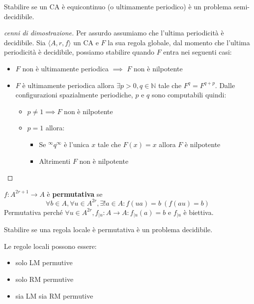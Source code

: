 \begin{teorema}
    Stabilire se un CA è equicontinuo (o ultimamente periodico) è un problema semi-decidibile.
    \begin{proof} [cenni di dimostrazione]
        Per assurdo assumiamo che l'ultima periodicità è decidibile. Sia 
        $\langle A,r,f\rangle$  un CA e $F$ la sua regola globale, dal momento
        che l'ultima periodicità è decidibile, possiamo stabilire quando $F$ entra 
        nei seguenti casi:
        \begin{itemize}
            \item $F$ non è ultimamente periodica $\implies$ $F$ non è nilpotente
            \item $F$ è ultimamente periodica allora $\exists p>0, q\in \mathbb{N}$
            tale che $F^q=F^{q+p}$. Dalle configurazioni spazialmente periodiche,
            $p$ e $q$ sono computabili quindi:
            \begin{itemize}
                \item $p\ne 1\implies F$ non è nilpotente
                \item $p= 1$ allora:
                \begin{itemize}
                    \item Se $^\infty q^\infty$ è l'unica $x$ tale che $F(x)=x$ allora
                    $F$ è nilpotente
                    \item Altrimenti $F$ non è nilpotente
                \end{itemize}
            \end{itemize}
        \end{itemize}
    \end{proof}
\end{teorema}

\begin{definizione}
    $f:A^{2r+1}\rightarrow A$ è \textbf{permutativa} se 
    $$\forall b\in A, \forall u \in A^{2r}, \exists ! a\in A: f(ua)=b \ (f(au)=b)$$
    Permutativa perché $\forall u \in A^{2r}, f_{|u}:A\rightarrow A:f_{|u}(a) = b$
    e $f_{|u}$ è biettiva.
\end{definizione}

\begin{teorema}
    Stabilire se una regola locale è permutativa è un problema decidibile.
\end{teorema}

\begin{nota}
    Le regole locali possono essere:
    \begin{itemize}
        \item solo LM permutive
        \item solo RM permutive
        \item sia LM sia RM permutive
    \end{itemize}
\end{nota}

